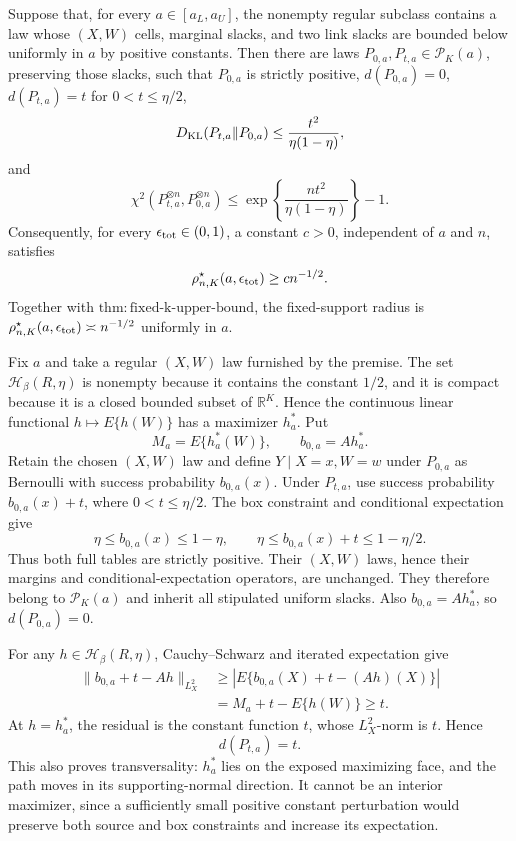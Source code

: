 Suppose that, for every \(a\in[a_L,a_U]\), the nonempty regular subclass contains a law whose \((X,W)\) cells, marginal slacks, and two link slacks are bounded below uniformly in \(a\) by positive constants.  Then there are laws \(P_{0,a},P_{t,a}\in\mathcal P_K(a)\), preserving those slacks, such that \(P_{0,a}\) is strictly positive, \(d(P_{0,a})=0\), \(d(P_{t,a})=t\) for \(0<t\le\eta/2\),
\[
 D_{\rm KL}(P_{t,a}\|P_{0,a})\le\frac{t^2}{\eta(1-\eta)},
\]
and
\[
 \chi^2(P_{t,a}^{\otimes n},P_{0,a}^{\otimes n})
 \le \exp\!\left\{\frac{nt^2}{\eta(1-\eta)}\right\}-1.
\]
Consequently, for every \(\epsilon_{\rm tot}\in(0,1)\), a constant \(c>0\), independent of \(a\) and \(n\), satisfies
\[
 \rho^\star_{n,K}(a,\epsilon_{\rm tot})\ge c n^{-1/2}.
\]
Together with \(\mathrm{thm:fixed\mbox{-}k\mbox{-}upper\mbox{-}bound}\), the fixed-support radius is \(\rho^\star_{n,K}(a,\epsilon_{\rm tot})\asymp n^{-1/2}\) uniformly in \(a\).

Fix \(a\) and take a regular \((X,W)\) law furnished by the premise.  The set \(\mathcal H_\beta(R,\eta)\) is nonempty because it contains the constant \(1/2\), and it is compact because it is a closed bounded subset of \(\mathbb R^K\).  Hence the continuous linear functional \(h\mapsto E\{h(W)\}\) has a maximizer \(h_a^*\).  Put
\[
 M_a=E\{h_a^*(W)\},\qquad b_{0,a}=Ah_a^*.
\]
Retain the chosen \((X,W)\) law and define \(Y\mid X=x,W=w\) under \(P_{0,a}\) as Bernoulli with success probability \(b_{0,a}(x)\).  Under \(P_{t,a}\), use success probability \(b_{0,a}(x)+t\), where \(0<t\le\eta/2\).  The box constraint and conditional expectation give
\[
 \eta\le b_{0,a}(x)\le1-\eta,
 \qquad
 \eta\le b_{0,a}(x)+t\le1-\eta/2. \tag{24}
\]
Thus both full tables are strictly positive.  Their \((X,W)\) laws, hence their margins and conditional-expectation operators, are unchanged.  They therefore belong to \(\mathcal P_K(a)\) and inherit all stipulated uniform slacks.  Also \(b_{0,a}=Ah_a^*\), so \(d(P_{0,a})=0\).

For any \(h\in\mathcal H_\beta(R,\eta)\), Cauchy--Schwarz and iterated expectation give
\[
 \begin{split}
 \|b_{0,a}+t-Ah\|_{L^2_X}
 &\ge \left|E\{b_{0,a}(X)+t-(Ah)(X)\}\right|\\
 &=M_a+t-E\{h(W)\}\ge t.
 \end{split}\tag{25}
\]
At \(h=h_a^*\), the residual is the constant function \(t\), whose \(L^2_X\)-norm is \(t\).  Hence
\[
 d(P_{t,a})=t. \tag{26}
\]
This also proves transversality: \(h_a^*\) lies on the exposed maximizing face, and the path moves in its supporting-normal direction.  It cannot be an interior maximizer, since a sufficiently small positive constant perturbation would preserve both source and box constraints and increase its expectation.

